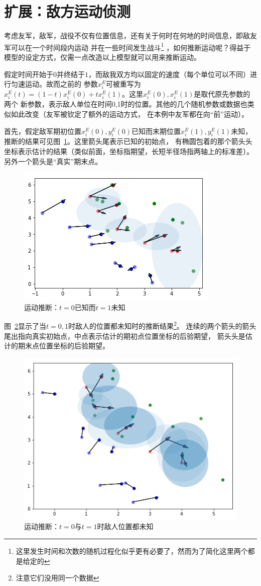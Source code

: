 \documentclass{article}
\begin{document}
\section{扩展：敌方运动侦测}


考虑友军，敌军，战役不仅有位置信息，还有关于何时在何地的时间信息，即敌友军可以在一个时间段内运动
并在一些时间发生战斗\footnote{这里发生时间和次数的随机过程化似乎更有必要了，然而为了简化这里两个都是给定的}
，如何推断运动呢？得益于模型的设定方式，仅需一点改造以上模型就可以用来推断运动。

假定时间开始于$0$并终结于$1$，而敌我双方均以固定的速度（每个单位可以不同）进行匀速运动。故而之前的
参数$x^E_i$可被重写为$x^E_i(t) = (1-t)x^E_i(0) + tx^E_i(1)$。这里$x^E_i(0),x^E_i(1)$是取代原先参数的两个
新参数，表示敌人单位在时间0,1时的位置。其他的几个随机参数或数据也类似如此改变（友军被钦定了额外的运动方式，
在本例中友军都在向“前”运动）。

首先，假定敌军期初位置$x^E_i(0),y^E_i(0)$已知而末期位置$x^E_i(1),y^E_i(1)$未知，
推断的结果可见图~\ref{fig:bkeu}。这里箭头尾表示已知的初始点，
有椭圆包着的那个箭头头坐标表示估计的结果（类似前面，坐标指期望，长短半径场指两轴上的标准差）。
另外一个箭头是“真实”期末点。

\begin{figure}[ht]
\includegraphics[width=0.4\linewidth]{bkeu.png}
\caption{运动推断：$t=0$已知而$t=1$未知}
\label{fig:bkeu}
\end{figure}


图~\ref{fig:bueu}显示了当$t=0,1$时敌人的位置都未知时的推断结果\footnote{注意它们没用同一个数据}。
连续的两个箭头的箭头尾出指向真实初始点，中点表示估计的期初点位置坐标的后验期望，
箭头头是估计的期末点位置坐标的后验期望。

\begin{figure}[ht]
\includegraphics[width=0.6\linewidth]{bueu.png}
\caption{运动推断：$t=0$与$t=1$时敌人位置都未知}
\label{fig:bueu}
\end{figure}
\end{document}
